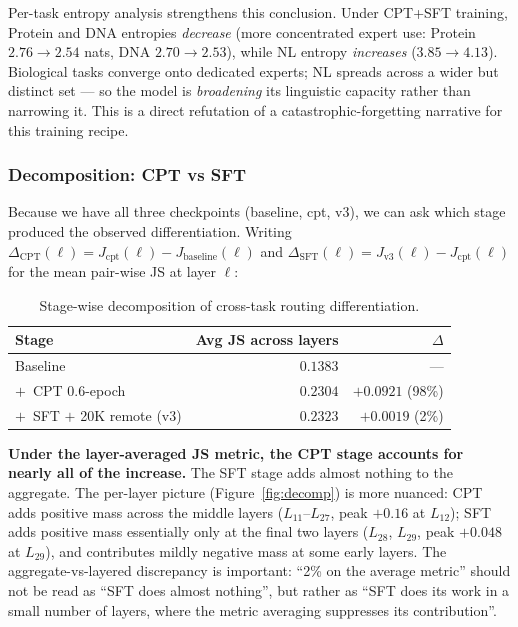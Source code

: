 \documentclass[11pt]{article}
\begin{document}
Per-task entropy analysis strengthens this conclusion. Under CPT+SFT training, Protein and DNA entropies \emph{decrease} (more concentrated expert use: Protein $2.76 \to 2.54$ nats, DNA $2.70 \to 2.53$), while NL entropy \emph{increases} ($3.85 \to 4.13$). Biological tasks converge onto dedicated experts; NL spreads across a wider but distinct set --- so the model is \emph{broadening} its linguistic capacity rather than narrowing it. This is a direct refutation of a catastrophic-forgetting narrative for this training recipe.

\subsubsection{Decomposition: CPT vs SFT}
\label{sec:moe-decomp}

Because we have all three checkpoints (baseline, cpt, v3), we can ask which stage produced the observed differentiation. Writing $\Delta_{\mathrm{CPT}}(\ell) = J_{\mathrm{cpt}}(\ell) - J_{\mathrm{baseline}}(\ell)$ and $\Delta_{\mathrm{SFT}}(\ell) = J_{\mathrm{v3}}(\ell) - J_{\mathrm{cpt}}(\ell)$ for the mean pair-wise JS at layer $\ell$:

\begin{table}[H]
\centering
\small
\caption{Stage-wise decomposition of cross-task routing differentiation.}
\label{tab:decomp}
\begin{tabular}{lrr}
\toprule
\textbf{Stage} & \textbf{Avg JS across layers} & \textbf{$\Delta$} \\
\midrule
Baseline                         & $0.1383$ & ---       \\
$+\,$ CPT 0.6-epoch              & $0.2304$ & $\mathbf{+0.0921}$ (98\%) \\
$+\,$ SFT $+$ 20K remote (v3)    & $0.2323$ & $+0.0019$ (2\%) \\
\bottomrule
\end{tabular}
\end{table}

\textbf{Under the layer-averaged JS metric, the CPT stage accounts for nearly all of the increase.} The SFT stage adds almost nothing to the aggregate. The per-layer picture (Figure~\ref{fig:decomp}) is more nuanced: CPT adds positive mass across the middle layers ($L_{11}$--$L_{27}$, peak $+0.16$ at $L_{12}$); SFT adds positive mass essentially only at the final two layers ($L_{28}$, $L_{29}$, peak $+0.048$ at $L_{29}$), and contributes mildly negative mass at some early layers. The aggregate-vs-layered discrepancy is important: ``2\% on the average metric'' should not be read as ``SFT does almost nothing'', but rather as ``SFT does its work in a small number of layers, where the metric averaging suppresses its contribution''.
\end{document}
